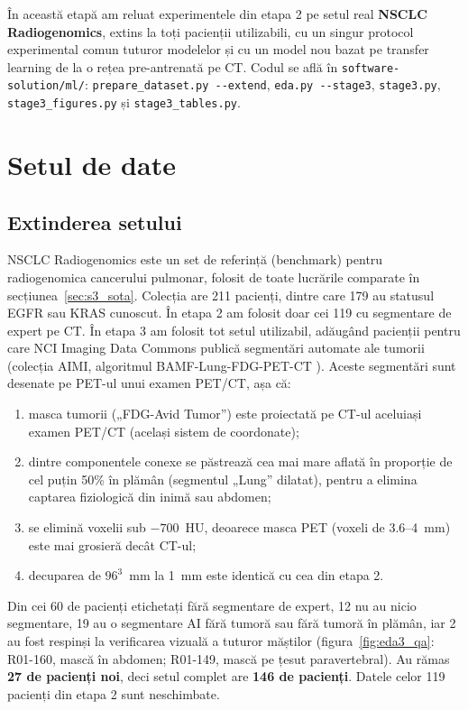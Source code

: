 \documentclass[runningheads,a4paper,11pt]{report}
\begin{document}
În această etapă am reluat experimentele din etapa 2 pe setul real \textbf{NSCLC Radiogenomics}, extins la toți pacienții utilizabili, cu un singur protocol experimental comun tuturor modelelor și cu un model nou bazat pe transfer learning de la o rețea pre-antrenată pe CT. Codul se află în \texttt{software-solution/ml/}: \texttt{prepare\_dataset.py -{}-extend}, \texttt{eda.py -{}-stage3}, \texttt{stage3.py}, \texttt{stage3\_figures.py} și \texttt{stage3\_tables.py}.

\section{Setul de date}

\subsection{Extinderea setului}
NSCLC Radiogenomics \cite{bakr2018} este un set de referință (benchmark) pentru radiogenomica cancerului pulmonar, folosit de toate lucrările comparate în secțiunea~\ref{sec:s3_sota}. Colecția are 211 pacienți, dintre care 179 au statusul EGFR sau KRAS cunoscut. În etapa 2 am folosit doar cei 119 cu segmentare de expert pe CT. În etapa 3 am folosit tot setul utilizabil, adăugând pacienții pentru care NCI Imaging Data Commons publică segmentări automate ale tumorii (colecția AIMI, algoritmul BAMF-Lung-FDG-PET-CT \cite{aimi}). Aceste segmentări sunt desenate pe PET-ul unui examen PET/CT, așa că:
\begin{enumerate}
    \item masca tumorii („FDG-Avid Tumor”) este proiectată pe CT-ul aceluiași examen PET/CT (același sistem de coordonate);
    \item dintre componentele conexe se păstrează cea mai mare aflată în proporție de cel puțin 50\% în plămân (segmentul „Lung” dilatat), pentru a elimina captarea fiziologică din inimă sau abdomen;
    \item se elimină voxelii sub $-700$~HU, deoarece masca PET (voxeli de 3.6--4~mm) este mai grosieră decât CT-ul;
    \item decuparea de $96^3$~mm la 1~mm este identică cu cea din etapa 2.
\end{enumerate}
Din cei 60 de pacienți etichetați fără segmentare de expert, 12 nu au nicio segmentare, 19 au o segmentare AI fără tumoră sau fără tumoră în plămân, iar 2 au fost respinși la verificarea vizuală a tuturor măștilor (figura~\ref{fig:eda3_qa}: R01-160, mască în abdomen; R01-149, mască pe țesut paravertebral). Au rămas \textbf{27 de pacienți noi}, deci setul complet are \textbf{146 de pacienți}. Datele celor 119 pacienți din etapa 2 sunt neschimbate.
\end{document}
